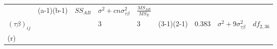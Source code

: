 \documentclass[12pt,]{article}
\begin{document}
\begin{longtable}[]{@{}lllllllll@{}}
\begin{minipage}[t]{0.03\columnwidth}
\end{minipage} & \begin{minipage}[t]{0.12\columnwidth}\raggedright
(a-1)(b-1)\strut
\end{minipage} & \begin{minipage}[t]{0.15\columnwidth}\raggedright
\(SS_{AB}\)\strut
\end{minipage} & \begin{minipage}[t]{0.21\columnwidth}\raggedright
\(\sigma^2+cn\sigma^2_{\tau\beta}\)\strut
\end{minipage} & \begin{minipage}[t]{0.09\columnwidth}\raggedright
\(\frac{MS_{AB}}{MS_{E}}\)\strut
\end{minipage}\tabularnewline
\begin{minipage}[t]{0.06\columnwidth}\raggedright
\((\tau\beta)_{ij}\)\strut
\end{minipage} & \begin{minipage}[t]{0.03\columnwidth}\raggedright
\strut
\end{minipage} & \begin{minipage}[t]{0.03\columnwidth}\raggedright
\strut
\end{minipage} & \begin{minipage}[t]{0.03\columnwidth}\raggedright
3\strut
\end{minipage} & \begin{minipage}[t]{0.03\columnwidth}\raggedright
3\strut
\end{minipage} & \begin{minipage}[t]{0.12\columnwidth}\raggedright
(3-1)(2-1)\strut
\end{minipage} & \begin{minipage}[t]{0.15\columnwidth}\raggedright
0.383\strut
\end{minipage} & \begin{minipage}[t]{0.21\columnwidth}\raggedright
\(\sigma^2+9\sigma^2_{\tau\beta}\)\strut
\end{minipage} & \begin{minipage}[t]{0.09\columnwidth}\raggedright
\(df_{2,36}\)\strut
\end{minipage}\tabularnewline
\begin{minipage}[t]{0.06\columnwidth}\raggedright
(r)\strut
\end{minipage} & \begin{minipage}[t]{0.03\columnwidth}\raggedright
\strut
\end{minipage} & \begin{minipage}[t]{0.03\columnwidth}\raggedright

\end{minipage}
\end{longtable}
\end{document}
